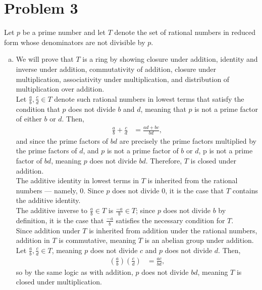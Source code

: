 \documentclass[9pt]{extarticle}
\begin{document}
  \section{Problem 3}%
  Let $p$ be a prime number and let $T$ denote the set of rational numbers in reduced form whose denominators are not divisible by $p$.
  \begin{enumerate}[(a)]
    \item We will prove that $T$ is a ring by showing closure under addition, identity and inverse under addition, commutativity of addition, closure under multiplication, associativity under multiplication, and distribution of multiplication over addition.\\

      Let $\frac{a}{b},\frac{c}{d}\in T$ denote such rational numbers in lowest terms that satisfy the condition that $p$ does not divide $b$ and $d$, meaning that $p$ is not a prime factor of either $b$ or $d$. Then,
      \begin{align*}
        \frac{a}{b} + \frac{c}{d} &= \frac{ad + bc}{bd},
      \end{align*}
      and since the prime factors of $bd$ are precisely the prime factors multiplied by the prime factors of $d$, and $p$ is not a prime factor of $b$ or $d$, p is not a prime factor of $bd$, meaning $p$ does not divide $bd$. Therefore, $T$ is closed under addition.\\

      The additive identity in lowest terms in $T$ is inherited from the rational numbers --- namely, $0$. Since $p$ does not divide $0$, it is the case that $T$ contains the additive identity.\\

      The additive inverse to $\frac{a}{b}\in T$ is $\frac{-a}{b}\in T$; since $p$ does not divide $b$ by definition, it is the case that $\frac{-a}{b}$ satisfies the necessary condition for $T$.\\

      Since addition under $T$ is inherited from addition under the rational numbers, addition in $T$ is commutative, meaning $T$ is an abelian group under addition.\\

      Let $\frac{a}{b},\frac{c}{d}\in T$, meaning $p$ does not divide $c$ and $p$ does not divide $d$. Then,
      \begin{align*}
        \left(\frac{a}{b}\right)\left(\frac{c}{d}\right) &= \frac{ac}{bd},
      \end{align*}
      so by the same logic as with addition, $p$ does not divide $bd$, meaning $T$ is closed under multiplication.\\


\end{enumerate}
\end{document}
